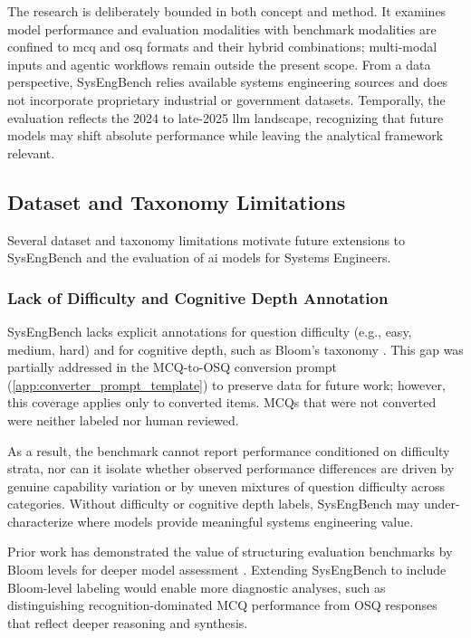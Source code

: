 The research is deliberately bounded in both concept and method. It examines model performance and evaluation modalities with benchmark modalities are confined to \ac{mcq} and \ac{osq} formats and their hybrid combinations; multi-modal inputs and agentic workflows remain outside the present scope. From a data perspective, SysEngBench relies available systems engineering sources and does not incorporate proprietary industrial or government datasets. Temporally, the evaluation reflects the 2024 to late-2025 \ac{llm} landscape, recognizing that future models may shift absolute performance while leaving the analytical framework relevant.

\subsection{Dataset and Taxonomy Limitations}

Several dataset and taxonomy limitations motivate future extensions to SysEngBench and the evaluation of \ac{ai} models for Systems Engineers.

\subsubsection{Lack of Difficulty and Cognitive Depth Annotation}

SysEngBench lacks explicit annotations for question difficulty (e.g., easy, medium, hard) and for cognitive depth, such as Bloom's taxonomy \cite{blooms_taxonomy_1956}. This gap was partially addressed in the MCQ-to-OSQ conversion prompt (\ref{app:converter_prompt_template}) to preserve data for future work; however, this coverage applies only to converted items. MCQs that were not converted were neither labeled nor human reviewed.

As a result, the benchmark cannot report performance conditioned on difficulty strata, nor can it isolate whether observed performance differences are driven by genuine capability variation or by uneven mixtures of question difficulty across categories. Without difficulty or cognitive depth labels, SysEngBench may under-characterize where models provide meaningful systems engineering value.

Prior work has demonstrated the value of structuring evaluation benchmarks by Bloom levels for deeper model assessment \cite{Liangtai_Sun_2023_SciEval_Benchmark}. Extending SysEngBench to include Bloom-level labeling would enable more diagnostic analyses, such as distinguishing recognition-dominated MCQ performance from OSQ responses that reflect deeper reasoning and synthesis.


